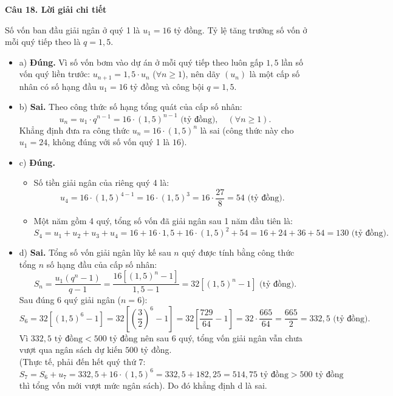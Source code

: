 \documentclass[12pt, a4paper]{article}
\begin{document}
\noindent\textbf{Câu 18. Lời giải chi tiết}\par
\begin{tcolorbox}[enhanced,breakable,colback=solutionbg,colframe=secondary!50!black,frame hidden,borderline west={3pt}{0pt}{secondary!50!black}]
Số vốn ban đầu giải ngân ở quý 1 là $u_1 = 16$ tỷ đồng. Tỷ lệ tăng trưởng số vốn ở mỗi quý tiếp theo là $q = 1{,}5$.
\begin{itemize}[leftmargin=1.5em]
\item a) \textbf{Đúng.} Vì số vốn bơm vào dự án ở mỗi quý tiếp theo luôn gấp $1{,}5$ lần số vốn quý liền trước: $u_{n+1} = 1{,}5 \cdot u_n$ ($\forall n \ge 1$), nên dãy $(u_n)$ là một cấp số nhân có số hạng đầu $u_1 = 16$ tỷ đồng và công bội $q = 1{,}5$.

\item b) \textbf{Sai.} Theo công thức số hạng tổng quát của cấp số nhân:
$$u_n = u_1 \cdot q^{n-1} = 16 \cdot (1{,}5)^{n-1}\text{ (tỷ đồng)},\quad (\forall n \ge 1).$$
Khẳng định đưa ra công thức $u_n = 16 \cdot (1{,}5)^n$ là sai (công thức này cho $u_1 = 24$, không đúng với số vốn quý 1 là $16$).

\item c) \textbf{Đúng.}
\begin{itemize}
\item Số tiền giải ngân của riêng quý 4 là:
$$u_4 = 16 \cdot (1{,}5)^{4-1} = 16 \cdot (1{,}5)^3 = 16 \cdot \dfrac{27}{8} = 54\text{ (tỷ đồng)}.$$
\item Một năm gồm 4 quý, tổng số vốn đã giải ngân sau 1 năm đầu tiên là:
$$S_4 = u_1 + u_2 + u_3 + u_4 = 16 + 16 \cdot 1{,}5 + 16 \cdot (1{,}5)^2 + 54 = 16 + 24 + 36 + 54 = 130\text{ (tỷ đồng)}.$$
\end{itemize}

\item d) \textbf{Sai.} Tổng số vốn giải ngân lũy kế sau $n$ quý được tính bằng công thức tổng $n$ số hạng đầu của cấp số nhân:
$$S_n = \dfrac{u_1(q^n - 1)}{q - 1} = \dfrac{16[(1{,}5)^n - 1]}{1{,}5 - 1} = 32[(1{,}5)^n - 1]\text{ (tỷ đồng)}.$$
Sau đúng $6$ quý giải ngân ($n = 6$):
$$S_6 = 32[(1{,}5)^6 - 1] = 32\left[\left(\dfrac{3}{2}\right)^6 - 1\right] = 32\left[\dfrac{729}{64} - 1\right] = 32 \cdot \dfrac{665}{64} = \dfrac{665}{2} = 332{,}5\text{ (tỷ đồng)}.$$
Vì $332{,}5\text{ tỷ đồng} < 500\text{ tỷ đồng}$ nên sau 6 quý, tổng vốn giải ngân vẫn chưa vượt qua ngân sách dự kiến $500$ tỷ đồng.\\
(Thực tế, phải đến hết quý thứ 7: $S_7 = S_6 + u_7 = 332{,}5 + 16 \cdot (1{,}5)^6 = 332{,}5 + 182{,}25 = 514{,}75\text{ tỷ đồng} > 500\text{ tỷ đồng}$ thì tổng vốn mới vượt mức ngân sách). Do đó khẳng định d là sai.
\end{itemize}
\end{tcolorbox}
\end{document}
